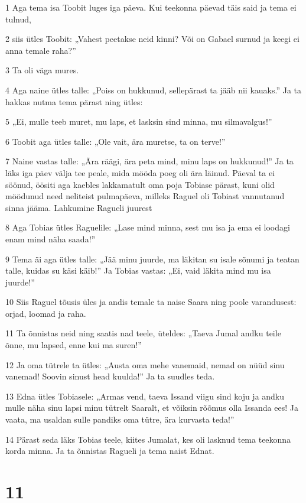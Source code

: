 \par 1 Aga tema isa Toobit luges iga päeva. Kui teekonna päevad täis  said ja tema ei tulnud,
\par 2 siis ütles Toobit: „Vahest peetakse neid kinni? Või on Gabael  surnud ja keegi ei anna temale raha?”
\par 3 Ta oli väga mures.
\par 4 Aga naine ütles talle: „Poiss on hukkunud, sellepärast ta jääb  nii kauaks.” Ja ta hakkas nutma tema pärast ning ütles:
\par 5 „Ei, mulle teeb muret, mu laps, et lasksin sind minna, mu  silmavalgus!”
\par 6 Toobit aga ütles talle: „Ole vait, ära muretse, ta on terve!”
\par 7 Naine vastas talle: „Ära räägi, ära peta mind, minu laps on  hukkunud!” Ja ta läks iga päev välja tee peale, mida mööda poeg oli  ära läinud. Päeval ta ei söönud, öösiti aga kaebles lakkamatult oma  poja Tobiase pärast, kuni olid möödunud need neliteist  pulmapäeva, milleks Raguel oli Tobiast vannutanud sinna jääma. Lahkumine Ragueli juurest
\par 8 Aga Tobias ütles Raguelile: „Lase mind minna, sest mu isa ja ema  ei loodagi enam mind näha saada!”
\par 9 Tema äi aga ütles talle: „Jää minu juurde, ma läkitan su isale  sõnumi ja teatan talle, kuidas su käsi käib!” Ja Tobias vastas: „Ei,  vaid läkita mind mu isa juurde!”
\par 10 Siis Raguel tõusis üles ja andis temale ta naise Saara ning  poole varandusest: orjad, loomad ja raha.
\par 11 Ta õnnistas neid ning saatis nad teele, üteldes: „Taeva Jumal  andku teile õnne, mu lapsed, enne kui ma suren!”
\par 12 Ja oma tütrele ta ütles: „Austa oma mehe vanemaid, nemad on nüüd  sinu vanemad! Soovin sinust head kuulda!” Ja ta suudles teda.
\par 13 Edna ütles Tobiasele: „Armas vend, taeva Issand viigu sind  koju ja andku mulle näha sinu lapsi minu tütrelt Saaralt, et võiksin  rõõmus olla Issanda ees! Ja vaata, ma usaldan sulle pandiks oma tütre,  ära kurvasta teda!”
\par 14 Pärast seda läks Tobias teele, kiites Jumalat, kes oli lasknud  tema teekonna korda minna. Ja ta õnnistas Ragueli ja tema naist Ednat.

\chapter{11}

